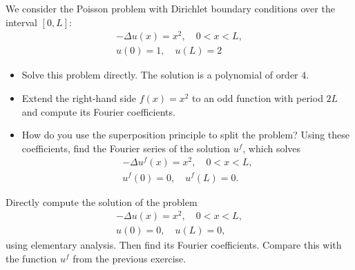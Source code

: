 \documentclass[11pt]{article}
\begin{document}
\begin{exercise}
    We consider the Poisson problem with Dirichlet boundary conditions over the interval $[0,L]$:
    \begin{gather*}
        - \Delta u(x) = x^2, \quad 0 < x < L,
        \\
        u(0) = 1, \quad u(L) = 2
    \end{gather*}
    \begin{itemize}
        \item Solve this problem directly. The solution is a polynomial of order $4$.
        \item Extend the right-hand side $f(x) = x^2$ to an odd function with period $2L$ and compute its Fourier coefficients.
        \item How do you use the superposition principle to split the problem? Using these coefficients, find the Fourier series of the solution $u^f$,
        which solves 
        \begin{gather*}
            - \Delta u^f(x) = x^2, \quad 0 < x < L,
            \\
            u^f(0) = 0, \quad u^f(L) = 0.
        \end{gather*}
    \end{itemize}
\end{exercise}
\begin{solution}     
\end{solution}

\begin{exercise}
    Directly compute the solution of the problem
    \begin{gather*}
        - \Delta u(x) = x^2, \quad 0 < x < L,
        \\
        u(0) = 0, \quad u(L) = 0,
    \end{gather*}
    using elementary analysis. Then find its Fourier coefficients. Compare this with the function $u^f$ from the previous exercise.
\end{exercise}
\begin{solution}     
\end{solution}
\end{document}
